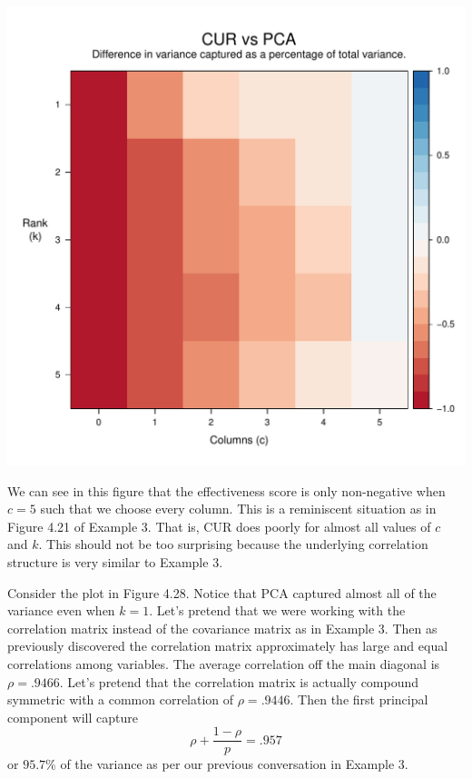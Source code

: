 \documentclass{book}
\begin{document}
\begin{center}
\includegraphics[scale=.63]{./Figures/crabs/raster.pdf}
\end{center}

We can see in this figure that the effectiveness score is only non-negative when $c=5$ such that we choose every column. This is a reminiscent situation as in Figure 4.21 of Example 3. That is, CUR does poorly for almost all values of $c$ and $k$. This should not be too surprising because the underlying correlation structure is very similar to Example 3.

Consider the plot in Figure 4.28. Notice that PCA captured almost all of the variance even when $k=1$. Let's pretend that we were working with the correlation matrix instead of the covariance matrix as in Example 3. Then as previously discovered the correlation matrix approximately has large and equal correlations among variables. The average correlation off the main diagonal is $\rho=.9466$. Let's pretend that the correlation matrix is actually compound symmetric with a common correlation of $\rho=.9446$. Then the first principal component will capture 
$$
\rho+\frac{1-\rho}{p}=.957
$$
or $95.7\%$ of the variance as per our previous conversation in Example 3. 
\end{document}
